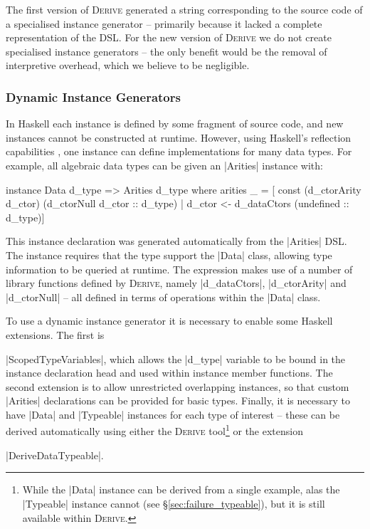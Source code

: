 \documentclass[preprint,draft]{sigplanconf}
\newcommand{\derive}{\textsc{Derive}}
\begin{document}
The first version of \derive{} generated a string corresponding to the source code of a specialised instance generator -- primarily because it lacked a complete representation of the DSL. For the new version of \derive{} we do not create specialised instance generators -- the only benefit would be the removal of interpretive overhead, which we believe to be negligible.

\subsubsection{Dynamic Instance Generators}
\label{sec:dynamic_instances}

In Haskell each instance is defined by some fragment of source code, and new instances cannot be constructed at runtime. However, using Haskell's reflection capabilities \cite{lammel:syb2}, one instance can define implementations for many data types. For example, all algebraic data types can be given an |Arities| instance with:

\begin{code}
instance Data d_type => Arities d_type where
    arities _ = 
        [  const (d_ctorArity d_ctor) (d_ctorNull d_ctor :: d_type)
        |  d_ctor <- d_dataCtors (undefined :: d_type)]
\end{code}

This instance declaration was generated automatically from the |Arities| DSL. The instance requires that the type support the |Data| class, allowing type information to be queried at runtime. The expression makes use of a number of library functions defined by \derive{}, namely |d_dataCtors|, |d_ctorArity| and |d_ctorNull| -- all defined in terms of operations within the |Data| class.

To use a dynamic instance generator it is necessary to enable some Haskell extensions. The first is \ignore|ScopedTypeVariables|, which allows the |d_type| variable to be bound in the instance declaration head and used within instance member functions. The second extension is to allow unrestricted overlapping instances, so that custom |Arities| declarations can be provided for basic types. Finally, it is necessary to have |Data| and |Typeable| instances for each type of interest -- these can be derived automatically using either the \derive{} tool\footnote{While the |Data| instance can be derived from a single example, alas the |Typeable| instance cannot (see \S\ref{sec:failure_typeable}), but it is still available within \derive{}.} or the extension \ignore|DeriveDataTypeable|.
\end{document}
